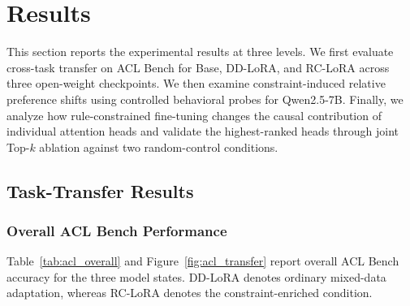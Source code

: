 \DeclareRobustCommand{\greenhl}[1]{%
  \begingroup\setlength{\fboxsep}{1.2pt}\colorbox{PositiveCell}{\strut #1}\endgroup}
\DeclareRobustCommand{\redhl}[1]{%
  \begingroup\setlength{\fboxsep}{1.2pt}\colorbox{NegativeCell}{\strut #1}\endgroup}
\DeclareRobustCommand{\neutralhl}[1]{%
  \begingroup\setlength{\fboxsep}{1.2pt}\colorbox{NeutralCell}{\strut #1}\endgroup}

\section{Results}
\label{sec:results}

This section reports the experimental results at three levels. We first evaluate cross-task transfer on ACL Bench for Base, DD-LoRA, and RC-LoRA across three open-weight checkpoints. We then examine constraint-induced relative preference shifts using controlled behavioral probes for Qwen2.5-7B. Finally, we analyze how rule-constrained fine-tuning changes the causal contribution of individual attention heads and validate the highest-ranked heads through joint Top-$k$ ablation against two random-control conditions.

\subsection{Task-Transfer Results}
\label{sec:task_transfer_results}

\subsubsection{Overall ACL Bench Performance}

Table~\ref{tab:acl_overall} and Figure~\ref{fig:acl_transfer} report overall ACL Bench accuracy for the three model states. DD-LoRA denotes ordinary mixed-data adaptation, whereas RC-LoRA denotes the constraint-enriched condition.

